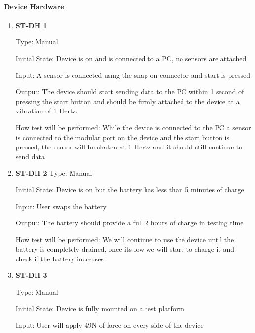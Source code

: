 \documentclass[12pt, titlepage]{article}
\begin{document}
  \paragraph{Device Hardware}	
  \begin{enumerate}
  
    \item{\bf{ST-DH 1}}
    
    Type: Manual
              
    Initial State: Device is on and is connected to a PC, no sensors are attached
              
    Input: A sensor is connected using the snap on connector and start is pressed
              
    Output: The device should start sending data to the PC within 1 second of pressing the start button and should be firmly attached to the device at a vibration of 1 Hertz.
              
    How test will be performed: While the device is connected to the PC a sensor is connected to the modular port on the device and the start button is pressed, the sensor will be shaken at 1 Hertz and it should still continue to send data\\
  
    \item{\bf{ST-DH 2}}
    Type: Manual
              
    Initial State: Device is on but the battery has less than 5 minutes of charge
              
    Input: User swaps the battery
              
    Output: The battery should provide a full 2 hours of charge in testing time
    
              
    How test will be performed: We will continue to use the device until the battery is completely drained, once its low we will start to charge it and check if the battery increases\\

    \item{\bf{ST-DH 3}}
    
    Type: Manual
              
    Initial State: Device is fully mounted on a test platform
              
    Input: User will apply 49N of force on every side of the device
              

\end{enumerate}
\end{document}
